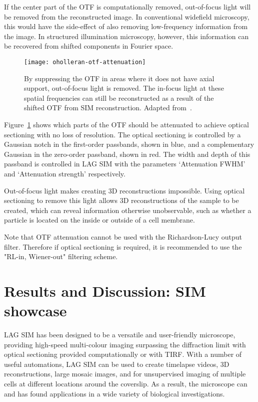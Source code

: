 If the center part of the OTF is computationally removed, out-of-focus light will be removed from the reconstructed image.
In conventional widefield microscopy, this would have the side-effect of also removing low-frequency information from the image. 
In structured illumination microscopy, however, this information can be recovered from shifted components in Fourier space. 

\begin{figure}[htbp!]
\centering
\texttt{[image: oholleran-otf-attenuation]}
\caption[LAG SIM: OTF attenuation]{By suppressing the OTF in areas where it does not have axial support, out-of-focus light is removed. The in-focus light at these spatial frequencies can still be reconstructed as a result of the shifted OTF from SIM reconstruction. Adapted from~\cite{oholleran2014optimized}. }
\label{fig:oholleran-otf}
\end{figure}

Figure~\ref{fig:oholleran-otf} shows which parts of the OTF should be attenuated to achieve optical sectioning with no loss of resolution. 
The optical sectioning is controlled by a Gaussian notch in the first-order passbands, shown in blue, and a complementary Gaussian in the zero-order passband, shown in red. 
The width and depth of this passband is controlled in LAG SIM with the parameters `Attenuation FWHM' and `Attenuation strength' respectively.


Out-of-focus light makes creating 3D reconstructions impossible. %
Using optical sectioning to remove this light allows 3D reconstructions of the sample to be created, which can reveal information otherwise unobservable, such as whether a particle is located on the inside or outside of a cell membrane. 

Note that OTF attenuation cannot be used with the Richardson-Lucy output filter. 
Therefore if optical sectioning is required, it is recommended to use the "RL-in, Wiener-out" filtering scheme. 


\section{Results and Discussion: SIM showcase} \label{sec:sim-showcase}
LAG SIM has been designed to be a versatile and user-friendly microscope, providing high-speed multi-colour imaging surpassing the diffraction limit with optical sectioning provided computationally or with TIRF. 
With a number of useful automations, LAG SIM can be used to create timelapse videos, 3D reconstructions, large mosaic images, and for unsupervised imaging of multiple cells at different locations around the coverslip. 
As a result, the microscope can and has found applications in a wide variety of biological investigations.

